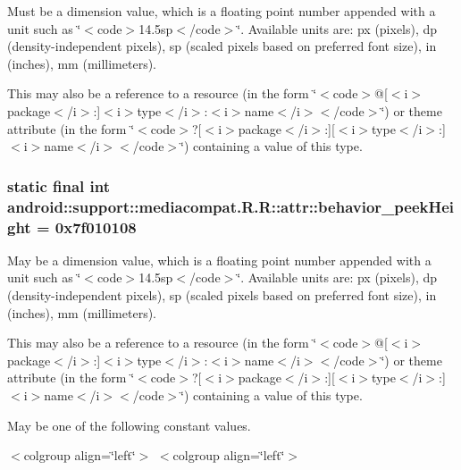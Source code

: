 Must be a dimension value, which is a floating point number appended with a unit such as \char`\"{}$<$code$>$14.5sp$<$/code$>$\char`\"{}. Available units are: px (pixels), dp (density-independent pixels), sp (scaled pixels based on preferred font size), in (inches), mm (millimeters). 

This may also be a reference to a resource (in the form \char`\"{}$<$code$>$@\mbox{[}$<$i$>$package$<$/i$>$:\mbox{]}$<$i$>$type$<$/i$>$:$<$i$>$name$<$/i$>$$<$/code$>$\char`\"{}) or theme attribute (in the form \char`\"{}$<$code$>$?\mbox{[}$<$i$>$package$<$/i$>$:\mbox{]}\mbox{[}$<$i$>$type$<$/i$>$:\mbox{]}$<$i$>$name$<$/i$>$$<$/code$>$\char`\"{}) containing a value of this type. \hypertarget{classandroid_1_1support_1_1mediacompat_1_1_r_1_1attr_e8e6f4c6875efedbd4503f7473a56c44}{
\subsubsection[{behavior\_\-peekHeight}]{\setlength{\rightskip}{0pt plus 5cm}static final int android::support::mediacompat.R.R::attr::behavior\_\-peekHeight = 0x7f010108}}
\label{classandroid_1_1support_1_1mediacompat_1_1_r_1_1attr_e8e6f4c6875efedbd4503f7473a56c44}


May be a dimension value, which is a floating point number appended with a unit such as \char`\"{}$<$code$>$14.5sp$<$/code$>$\char`\"{}. Available units are: px (pixels), dp (density-independent pixels), sp (scaled pixels based on preferred font size), in (inches), mm (millimeters). 

This may also be a reference to a resource (in the form \char`\"{}$<$code$>$@\mbox{[}$<$i$>$package$<$/i$>$:\mbox{]}$<$i$>$type$<$/i$>$:$<$i$>$name$<$/i$>$$<$/code$>$\char`\"{}) or theme attribute (in the form \char`\"{}$<$code$>$?\mbox{[}$<$i$>$package$<$/i$>$:\mbox{]}\mbox{[}$<$i$>$type$<$/i$>$:\mbox{]}$<$i$>$name$<$/i$>$$<$/code$>$\char`\"{}) containing a value of this type. 

May be one of the following constant values. \begin{TabularC}{0}
\hline
\end{TabularC}
$<$colgroup align=\char`\"{}left\char`\"{}$>$ $<$colgroup align=\char`\"{}left\char`\"{}$>$ 

